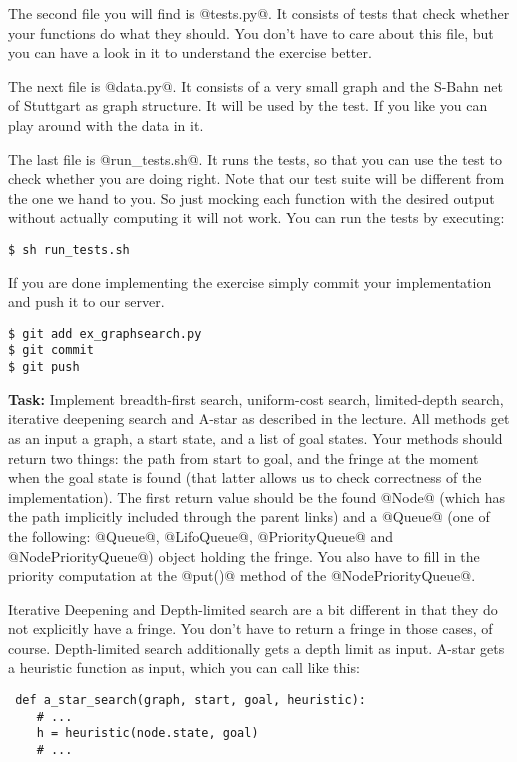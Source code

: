 The second file you will find is @tests.py@. It consists of tests that
check whether your functions do what they should. You don't have to
care about this file, but you can have a look in it to understand the
exercise better.

The next file is @data.py@. It consists of a very small graph and the S-Bahn net
of Stuttgart as graph structure. It will be used by the test. If you like you
can play around with the data in it.

The last file is @run_tests.sh@. It runs the tests, so that you can
use the test to check whether you are doing right. Note that our test
suite will be different from the one we hand to you. So just mocking
each function with the desired output without actually computing it
will not work. You can run the tests by executing:

{\small \verb+$ sh run_tests.sh+}

If you are done implementing the exercise simply commit your implementation and
push it to our server.

{\small 
\verb+$ git add ex_graphsearch.py+\\
\verb+$ git commit+\\
\verb+$ git push+}

\textbf{Task:} Implement breadth-first search, uniform-cost search,
limited-depth search, iterative deepening search and A-star as
described in the lecture. All methods get as an input a graph, a start
state, and a list of goal states. Your methods should return two things: the
path from start to goal, and the fringe at the moment when the goal
state is found (that latter allows us to check correctness of the
implementation). The first return value should be the found @Node@
(which has the path implicitly included through the parent links) and
a @Queue@ (one of the following: @Queue@, @LifoQueue@, @PriorityQueue@
and @NodePriorityQueue@) object holding the fringe. You also have to
fill in the priority computation at the @put()@ method of the
@NodePriorityQueue@.

Iterative Deepening and Depth-limited search are a bit different in that they do
not explicitly have a fringe. You don't have to return a fringe in those cases,
of course. Depth-limited search additionally gets a depth limit as input. A-star
gets a heuristic function as input, which you can call like this:

{\small
\verb+ def a_star_search(graph, start, goal, heuristic):+\\
\verb+    # ... +\\
\verb+    h = heuristic(node.state, goal)+\\
\verb+    # ...  +\\
}

